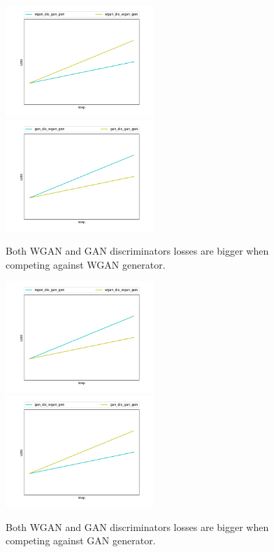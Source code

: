 	\begin{figure}[h] 
		\includegraphics[width=0.5\textwidth]{figures/wgan_wins_wgan_dis_gan_gen}
		\includegraphics[width=0.5\textwidth]{figures/wgan_wins_gan_dis_wgan_gen}
		\caption{Both WGAN and GAN discriminators losses are bigger when competing against WGAN generator.}
		\label{fig:cd_wgan_wins}
	\end{figure}
	\begin{figure}[h] 
		\includegraphics[width=0.5\textwidth]{figures/gan_wins_wgan_dis_gan_gen}
		\includegraphics[width=0.5\textwidth]{figures/gan_wins_gan_dis_wgan_gen}
		\caption{Both WGAN and GAN discriminators losses are bigger when competing against GAN generator.}
		\label{fig:cd_gan_wins}
	\end{figure}
